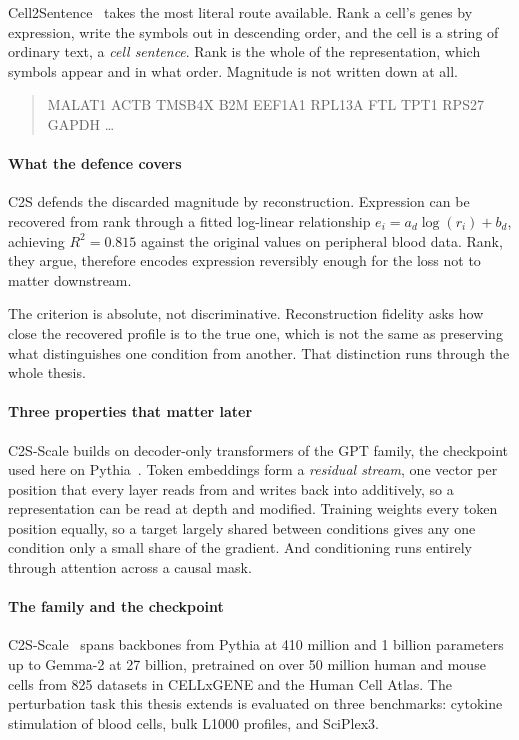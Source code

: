\noindent
Cell2Sentence~\cite{c2s} takes the most literal route available. Rank a cell's
genes by expression, write the symbols out in descending order, and the cell is a
string of ordinary text, a \emph{cell sentence}. Rank is the whole of the
representation, which symbols appear and in what order. Magnitude is not written
down at all.

\begin{quote}
\ttfamily\small
MALAT1 ACTB TMSB4X B2M EEF1A1 RPL13A FTL TPT1 RPS27 GAPDH \dots
\end{quote}

\paragraph{What the defence covers} C2S defends the discarded magnitude by
reconstruction. Expression can be recovered from rank through a fitted
log-linear relationship $e_i = a_d\log(r_i) + b_d$, achieving $R^2 = 0.815$
against the original values on peripheral blood data. Rank, they argue,
therefore encodes expression reversibly enough for the loss not to matter
downstream.

The criterion is absolute, not discriminative. Reconstruction fidelity asks how
close the recovered profile is to the true one, which is not the same as
preserving what distinguishes one condition from another. That distinction runs
through the whole thesis.

\paragraph{Three properties that matter later}
C2S-Scale builds on decoder-only transformers of the GPT family, the checkpoint
used here on Pythia~\cite{pythia}. Token embeddings form a \emph{residual
stream}, one vector per position that every layer reads from and writes back into
additively, so a representation can be read at depth and
modified. Training weights every token position equally, so a target largely
shared between conditions gives any one condition only a small share of the
gradient. And conditioning runs entirely through attention across a causal mask.

\paragraph{The family and the checkpoint}
C2S-Scale~\cite{c2sscale} spans backbones from Pythia at 410 million and 1
billion parameters up to Gemma-2 at 27 billion, pretrained on over 50 million
human and mouse cells from 825 datasets in CELLxGENE and the Human Cell Atlas.
The perturbation task this thesis extends is evaluated on three benchmarks:
cytokine stimulation of blood cells, bulk L1000 profiles, and SciPlex3.

